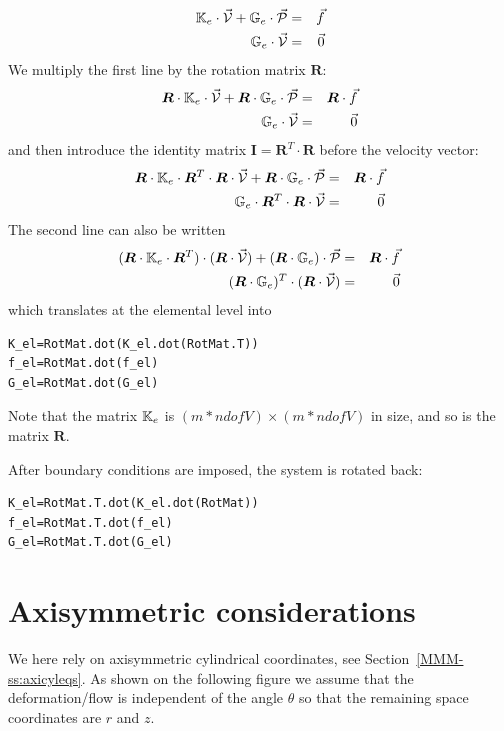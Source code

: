 \begin{eqnarray}
{\mathbb{K}}_e \cdot \vec{\cal V} + {\mathbb{G}}_e \cdot \vec{\cal P} &=& \vec{f}  \\
{\mathbb{G}}_e \cdot \vec{\cal V} &=& \vec{0}
\end{eqnarray}
We multiply the first line by the rotation matrix ${\bm R}$:
\begin{eqnarray}
{\bm R} \cdot {\mathbb{K}}_e \cdot \vec{\cal V} +{\bm R} \cdot {\mathbb{G}}_e \cdot \vec{\cal P} &=&{\bm R} \cdot \vec{f}  \\
{\mathbb{G}}_e \cdot \vec{\cal V} &=& \vec{0}
\end{eqnarray}
and then introduce the identity matrix ${\bm I}={\bm R}^T\cdot {\bm R}$ before the velocity vector:
\begin{eqnarray}
{\bm R} \cdot {\mathbb{K}}_e \cdot {\bm R}^T\cdot {\bm R} \cdot  \vec{\cal V} +{\bm R} \cdot {\mathbb{G}}_e \cdot \vec{\cal P} &=&{\bm R} \cdot \vec{f}  \\
{\mathbb{G}}_e \cdot  {\bm R}^T\cdot {\bm R} \cdot  \vec{\cal V} &=& \vec{0}
\end{eqnarray}
The second line can also be written
\begin{eqnarray}
({\bm R} \cdot {\mathbb{K}}_e \cdot {\bm R}^T) \cdot ({\bm R} \cdot  \vec{\cal V}) + ({\bm R} \cdot {\mathbb{G}}_e) \cdot \vec{\cal P} &=&{\bm R} \cdot \vec{f}  \\
( {\bm R} \cdot {\mathbb{G}}_e)^T \cdot  ({\bm R} \cdot  \vec{\cal V}) &=& \vec{0}
\end{eqnarray}
which translates at the elemental level into
\begin{lstlisting}
K_el=RotMat.dot(K_el.dot(RotMat.T))
f_el=RotMat.dot(f_el)
G_el=RotMat.dot(G_el)
\end{lstlisting}
Note that the matrix ${\mathbb{K}}_e$ is $(m*ndofV)\times (m*ndofV)$ in size, and so is the matrix ${\bm R}$.

After boundary conditions are imposed, the system is rotated back:

\begin{lstlisting}
K_el=RotMat.T.dot(K_el.dot(RotMat))
f_el=RotMat.T.dot(f_el)
G_el=RotMat.T.dot(G_el)
\end{lstlisting}



\section*{Axisymmetric considerations}

We here rely on axisymmetric cylindrical coordinates, see Section~\ref{MMM-ss:axicyleqs}.
As shown on the following figure we assume that the deformation/flow is independent of the angle 
$\theta$ so that the remaining space coordinates are $r$ and $z$.
\begin{center}

\end{center}

